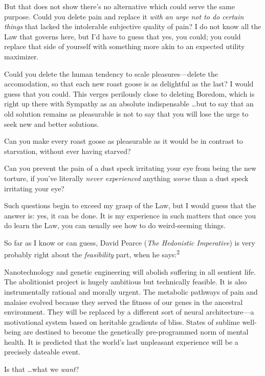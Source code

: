 {
 But that does not show there's no alternative
which could serve the same purpose. Could you delete pain and replace
it \textit{with an urge not to do certain things} that lacked the
intolerable subjective quality of pain? I do not know all the Law that
governs here, but I'd have to guess that yes, you
could; you could replace that side of yourself with something more akin
to an expected utility maximizer.}

{
 Could you delete the human tendency to scale pleasures---delete
the accomodation, so that each new roast goose is as delightful as the
last? I would guess that you could. This verges perilously close to
deleting Boredom, which is right up there with Sympathy as an absolute
indispensable \ldots but to say that an old solution remains as
pleasurable is not to say that you will lose the urge to seek new and
better solutions.}

{
 Can you make every roast goose as pleasurable as it would be in
contrast to starvation, without ever having starved?}

{
 Can you prevent the pain of a dust speck irritating your eye from
being the new torture, if you've literally
\textit{never experienced} anything \textit{worse} than a dust speck
irritating your eye?}

{
 Such questions begin to exceed my grasp of the Law, but I would
guess that the answer is: yes, it can be done. It is my experience in
such matters that once you do learn the Law, you can usually see how to
do weird-seeming things.}

{
 So far as I know or can guess, David Pearce (\textit{The
Hedonistic Imperative}) is very probably right about the
\textit{feasibility} part, when he says:\textsuperscript{2}}

{
 Nanotechnology and genetic engineering will abolish suffering in
all sentient life. The abolitionist project is hugely ambitious but
technically feasible. It is also instrumentally rational and morally
urgent. The metabolic pathways of pain and malaise evolved because they
served the fitness of our genes in the ancestral environment. They will
be replaced by a different sort of neural architecture---a motivational
system based on heritable gradients of bliss. States of sublime
well-being are destined to become the genetically pre-programmed norm
of mental health. It is predicted that the world's last
unpleasant experience will be a precisely dateable event.}

{
 Is that \ldots what we \textit{want}?}

